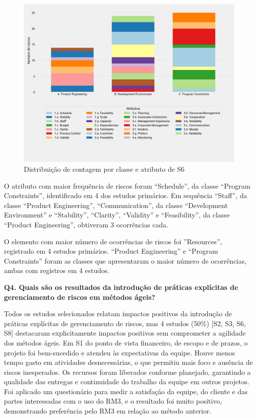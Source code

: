 \documentclass[
	12pt,
	openright,
	twoside,
	a4paper,
	english,
	brazil
	]{abntex2}
\begin{document}
\begin{figure}[H]
	\caption{\label{dist-contagem-classe-atributo}Distribuição de contagem por classe e atributo de S6}
  \includegraphics[width=\textwidth]{dist-contagem-classe-atributo}
\end{figure}

O atributo com maior frequência de riscos foram “Schedule”, da classe “Program Constraints”, identificado em 4 dos estudos primários. Em sequência “Staff”, da classe “Product Engineering”, “Communication”, da classe “Development Environment” e “Stability”,  “Clarity”, “Validity” e  “Feasibility”, da classe “Product Engineering”, obtiveram 3 ocorrências cada.

O elemento com maior número de ocorrências de riscos foi ”Resources”, registrado em 4 estudos primários. “Product Engineering” e “Program Constraints” foram as  classes que apresentaram o maior número de ocorrências, ambas com registros em 4 estudos.


\textbf{Q4. Quais são os resultados da introdução de práticas explícitas de gerenciamento de riscos em métodos ágeis?}

Todos os estudos selecionados relatam impactos positivos da introdução de práticas explícitas de gerenciamento de riscos, mas 4 estudos (50\%) [S2, S3, S6, S8] destacaram explicitamente impactos positivos sem comprometer a agilidade dos métodos ágeis.
Em S1 do ponto de vista financeiro, de escopo e de prazos, o projeto foi bem-sucedido e atendeu às expectativas da equipe. Houve menos tempo gasto em atividades desnecessárias, o que permitiu mais foco e ausência de riscos inesperados. Os recursos foram liberados conforme planejado, garantindo a qualidade das entregas e continuidade do trabalho da equipe em outros projetos. Foi aplicado um questionário para medir a satisfação da equipe, do cliente e das partes interessadas com o uso do RM3, e o resultado foi muito positivo,  demonstrando preferência pelo RM3 em relação ao método anterior.
\end{document}
